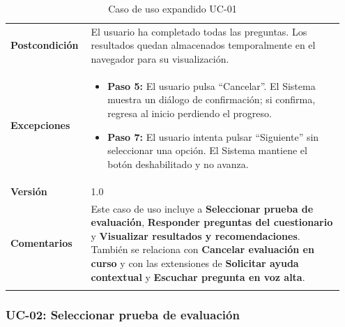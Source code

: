 \begin{longtable}{p{0.22\linewidth} p{0.73\linewidth}}
\textbf{Postcondición} & El usuario ha completado todas las preguntas. Los resultados quedan almacenados temporalmente en el navegador para su visualización. \\
\textbf{Excepciones} & 
  \begin{itemize}
    \item \textbf{Paso 5:} El usuario pulsa ``Cancelar''. El Sistema muestra un diálogo de confirmación; si confirma, regresa al inicio perdiendo el progreso.
    \item \textbf{Paso 7:} El usuario intenta pulsar ``Siguiente'' sin seleccionar una opción. El Sistema mantiene el botón deshabilitado y no avanza.
  \end{itemize} \\
\textbf{Versión} & 1.0 \\
\textbf{Comentarios} & Este caso de uso incluye a \textbf{Seleccionar prueba de evaluación}, \textbf{Responder preguntas del cuestionario} y \textbf{Visualizar resultados y recomendaciones}. También se relaciona con \textbf{Cancelar evaluación en curso} y con las extensiones de \textbf{Solicitar ayuda contextual} y \textbf{Escuchar pregunta en voz alta}. \\
\bottomrule
\caption{Caso de uso expandido UC-01}
\label{tab:uc01}
\end{longtable}

\subsubsection{UC-02: Seleccionar prueba de evaluación}

